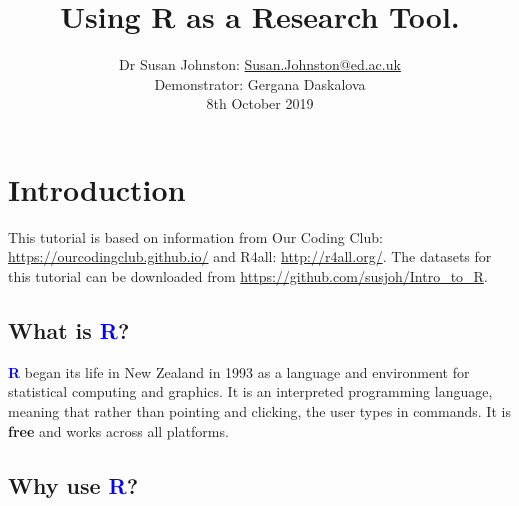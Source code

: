 \documentclass[a4paper,12pt]{article}
\newcommand\boldblue[1]{\textcolor{blue}{\textbf{#1}}}
\begin{document}





\title{Using R as a Research Tool.}
\author{\small{Dr Susan Johnston: \href{mailto:Susan.Johnston@ed.ac.uk}{Susan.Johnston@ed.ac.uk}}  \\
        \small{Demonstrator: Gergana Daskalova} \\
        \small{8th October 2019}}
    \date{}







\maketitle







\section {Introduction}

This tutorial is based on information from Our Coding Club: \url{https://ourcodingclub.github.io/} and R4all: \url{http://r4all.org/}. The datasets for this tutorial can be downloaded from \url{https://github.com/susjoh/Intro_to_R}.

\subsection {What is \boldblue{R}?}

\boldblue{R} began its life in New Zealand in 1993 as a language and environment for statistical computing and graphics. It is an interpreted programming language, meaning that rather than pointing and clicking, the user types in commands. It is \textbf{free} and works across all platforms.


\subsection {Why use \boldblue{R}?}
\end{document}
